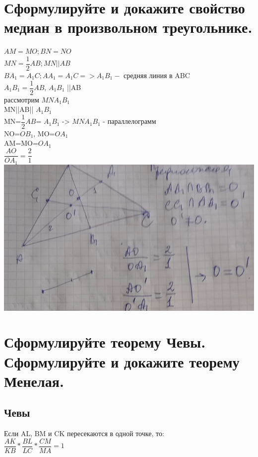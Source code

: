 \documentclass[12pt, letterpaper]{article}
\begin{document}
\section {Сформулируйте и докажите свойство медиан в произвольном треугольнике.}
$AM=MO; BN=NO$\\
$MN= \dfrac{1}{2}AB; MN||AB$\\
$BA_1=A_1C; AA_1=A_1C => A_1B_1-$ средняя линия в ABC \\
$A_1B_1=\dfrac{1}{2}AB$, $A_1B_1$ ||AB\\
рассмотрим $MNA_1B_1$\\
MN||AB|| $A_1B_1$ \\
MN=$\dfrac{1}{2}AB$= $A_1B_1$ -> $MNA_1B_1$ - параллелограмм\\
NO=$OB_1$, MO=$OA_1$\\
AM=MO=$OA_1$\\
$\dfrac{AO}{OA_1}=\dfrac{2}{1}$\\
\includegraphics[scale=0.3]{legal-8.jpg}\\


\section {Сформулируйте теорему Чевы. Сформулируйте и докажите теорему Менелая.}
\subsection{Чевы}
Если AL, BM и CK пересекаются в одной точке, то: \\
$\dfrac{AK}{KB}*\dfrac{BL}{LC}*\dfrac{CM}{MA}=1$\\
\end{document}
